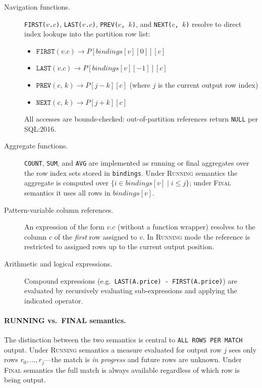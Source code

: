 \begin{description}
  \item[Navigation functions.]
    \texttt{FIRST($v$.$c$)}, \texttt{LAST($v$.$c$)},
    \texttt{PREV($c$, $k$)}, and \texttt{NEXT($c$, $k$)}
    resolve to direct index lookups into the partition row list:
    \begin{itemize}
      \item $\texttt{FIRST}(v.c) \to
        P[\mathit{bindings}[v][0]][c]$
      \item $\texttt{LAST}(v.c) \to
        P[\mathit{bindings}[v][-1]][c]$
      \item $\texttt{PREV}(c,\,k) \to
        P[j - k][c]$ (where $j$ is the current output row index)
      \item $\texttt{NEXT}(c,\,k) \to
        P[j + k][c]$
    \end{itemize}
    All accesses are bounds-checked: out-of-partition references
    return \texttt{NULL} per SQL:2016.

  \item[Aggregate functions.]
    \texttt{COUNT}, \texttt{SUM}, and \texttt{AVG} are implemented
    as running or final aggregates over the row index sets stored
    in \texttt{bindings}.  Under \textsc{Running} semantics the
    aggregate is computed over
    $\{ i \in \mathit{bindings}[v] \mid i \leq j \}$;
    under \textsc{Final} semantics it uses all rows in
    $\mathit{bindings}[v]$.

  \item[Pattern-variable column references.]
    An expression of the form $v.c$ (without a function wrapper)
    resolves to the column $c$ of the \emph{first} row assigned to
    $v$.  In \textsc{Running} mode the reference is restricted to
    assigned rows up to the current output position.

  \item[Arithmetic and logical expressions.]
    Compound expressions (e.g.\ \texttt{LAST(A.price) -
    FIRST(A.price)}) are evaluated by recursively evaluating
    sub-expressions and applying the indicated operator.
\end{description}

\paragraph{RUNNING vs.\ FINAL semantics.}
The distinction between the two semantics is central to
\texttt{ALL ROWS PER MATCH} output.  Under \textsc{Running}
semantics a measure evaluated for output row $j$ sees only rows
$r_0, \ldots, r_j$—the match is \emph{in progress} and future
rows are unknown.  Under \textsc{Final} semantics the full
match is always available regardless of which row is being output.


